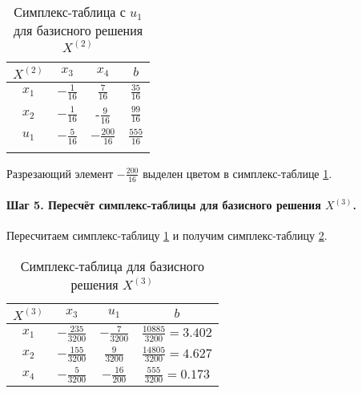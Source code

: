 \begin{table}[H]
\begin{center}
	\caption{Симплекс-таблица с $u_1$ для базисного решения $X^{(2)}$}
	\label{tab:simpl:4}
	\def\tabcolsep{18pt}
	\def\arraystretch{1.5}
	\fontsize{13}{14}\selectfont
	\begin{tabular}{|c|c||c||c|}
		\hline 
		$X^{(2)}$ & $x_3$ & $x_4$ & $b$ \\ 
		\hline
		$x_1$ & $-\frac{1}{16}$ & $\frac{7}{16}$ & $\frac{35}{16}$ \\ 
		\hline
		$x_2$ & $-\frac{1}{16}$ & -$\frac{9}{16}$ & $\frac{99}{16}$ \\ 
		\hhline{|=|=#=#=|}
		$u_1$ & $ -\frac{5}{16}$ & \cellcolor{pink} $-\frac{200}{16}$ & $\frac{555}{16}$ \\ 
		\hhline{|=|=#=#=|}
	\end{tabular} 
\end{center}
\end{table}

Разрезающий элемент $-\frac{200}{16}$ выделен цветом в симплекс-таблице \ref{tab:simpl:4}. 

\paragraph{Шаг 5. Пересчёт симплекс-таблицы для базисного решения $X^{(3)}$.}

Пересчитаем симплекс-таблицу \ref{tab:simpl:4} и получим симплекс-таблицу \ref{tab:simpl:5}.

\begin{table}[H]
\begin{center}
	\caption{Симплекс-таблица для базисного решения $X^{(3)}$}
	\label{tab:simpl:5}
	\def\tabcolsep{18pt}
	\def\arraystretch{1.5}
	\fontsize{13}{14}\selectfont
	\begin{tabular}{|c|c|c|c|}
		\hline 
		$X^{(3)}$ & $x_3$ & $u_1$ & $b$ \\ 
		\hline
		$x_1$ & $-\frac{235}{3200}$ & $-\frac{7}{3200}$ & \cellcolor{green} $\frac{10885}{3200} = 3.402$ \\ 
		\hline
		$x_2$ & $-\frac{155}{3200}$ & $\frac{9}{3200}$ & \cellcolor{green} $\frac{14805}{3200} = 4.627$ \\ 
		\hline
		$x_4$ & $ -\frac{5}{3200}$ & $-\frac{16}{200}$ & $\frac{555}{3200} = 0.173$ \\ 
		\hline
	\end{tabular} 
\end{center}
\end{table}


